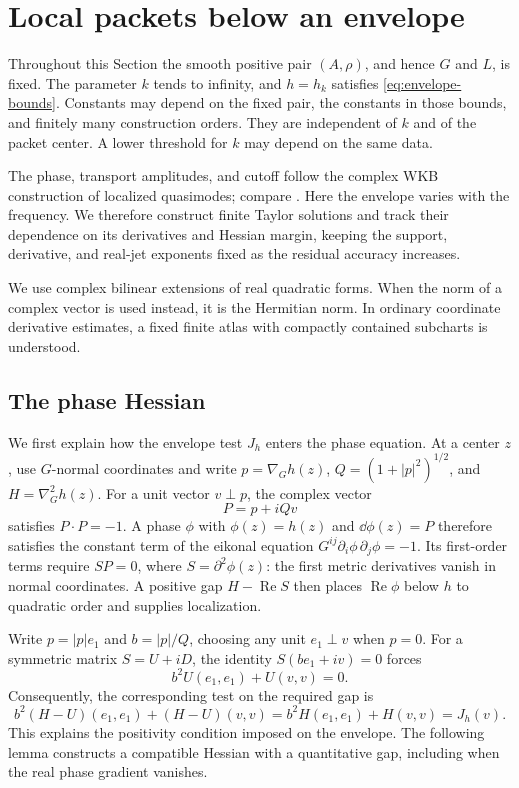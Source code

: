 \section{Local packets below an envelope}\label{sec:waves}

Throughout this Section the smooth positive pair \((A,\rho)\), and hence
\(G\) and \(L\), is fixed. The parameter \(k\) tends to infinity, and
\(h=h_k\) satisfies \eqref{eq:envelope-bounds}. Constants may depend on
the fixed pair, the constants in those bounds, and finitely many
construction orders. They are independent of \(k\) and of the packet
center. A lower threshold for \(k\) may depend on the same data.

The phase, transport amplitudes, and cutoff follow the complex WKB
construction of localized quasimodes; compare
\cite[Section~3]{DenckerSjostrandZworski2004}. Here the envelope varies
with the frequency. We therefore construct finite Taylor solutions and
track their dependence on its derivatives and Hessian margin, keeping
the support, derivative, and real-jet exponents fixed as the residual
accuracy increases.

We use complex bilinear extensions of real quadratic forms. When the
norm of a complex vector is used instead, it is the Hermitian norm.
In ordinary coordinate derivative estimates, a fixed finite atlas
with compactly contained subcharts is understood.

\subsection{The phase Hessian}

We first explain how the envelope test \(J_h\) enters the phase equation.
At a center \(z\), use \(G\)-normal coordinates and write
\(p=\nabla_Gh(z)\), \(Q=(1+|p|^2)^{1/2}\), and
\(H=\nabla_G^2h(z)\). For a unit vector \(v\perp p\), the complex
vector
\[
 P=p+iQv
\]
satisfies \(P\cdot P=-1\). A phase \(\phi\) with
\(\phi(z)=h(z)\) and \(\dd\phi(z)=P\) therefore satisfies the
constant term of the eikonal equation
\(G^{ij}\partial_i\phi\,\partial_j\phi=-1\). Its first-order terms
require \(SP=0\), where \(S=\partial^2\phi(z)\): the first metric
derivatives vanish in normal coordinates. A positive gap
\(H-\operatorname{Re}S\) then places \(\operatorname{Re}\phi\) below
\(h\) to quadratic order and supplies localization.

Write \(p=|p|e_1\) and \(b=|p|/Q\), choosing any unit
\(e_1\perp v\) when \(p=0\). For a symmetric matrix \(S=U+iD\),
the identity \(S(be_1+iv)=0\) forces
\[
 b^2U(e_1,e_1)+U(v,v)=0.
\]
Consequently, the corresponding test on the required gap is
\[
 b^2(H-U)(e_1,e_1)+(H-U)(v,v)
 =b^2H(e_1,e_1)+H(v,v)=J_h(v).
\]
This explains the positivity condition imposed on the envelope. The
following lemma constructs a compatible Hessian with a quantitative
gap, including when the real phase gradient vanishes.

